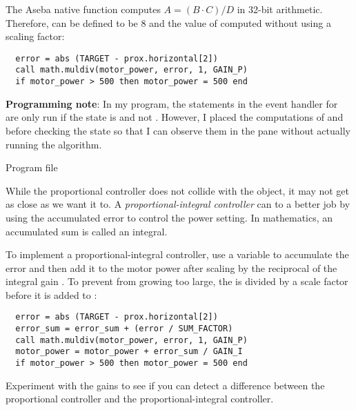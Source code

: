 The Aseba native function  computes $A = (B
\cdot C) / D$ in 32-bit arithmetic. Therefore,  can be
defined to be 8 and the value of  computed without using
a scaling factor:

\begin{verbatim}
  error = abs (TARGET - prox.horizontal[2])
  call math.muldiv(motor_power, error, 1, GAIN_P)
  if motor_power > 500 then motor_power = 500 end
\end{verbatim}

\textbf{Programming note}: In my program, the statements in the event
handler for  are only run if the state is  and not .
However, I placed the computations of  and 
before checking the state so that I can observe them in the
 pane without actually running the algorithm.


{\raggedleft \hfill Program file }

While the proportional controller does not collide with the object, it
may not get as close as we want it to. A \emph{proportional-integral
controller} can to a better job by using the accumulated error to
control the power setting. In mathematics, an accumulated sum is called
an integral.

To implement a proportional-integral controller, use a variable
 to accumulate the error and then add it to the motor
power after scaling by the reciprocal of the integral gain .
To prevent  from growing too large, the  is
divided by a scale factor  before it is added to
:

\begin{verbatim}
  error = abs (TARGET - prox.horizontal[2])
  error_sum = error_sum + (error / SUM_FACTOR)
  call math.muldiv(motor_power, error, 1, GAIN_P)
  motor_power = motor_power + error_sum / GAIN_I
  if motor_power > 500 then motor_power = 500 end
\end{verbatim}

Experiment with the gains to see if you can detect a difference between
the proportional controller and the proportional-integral controller.

